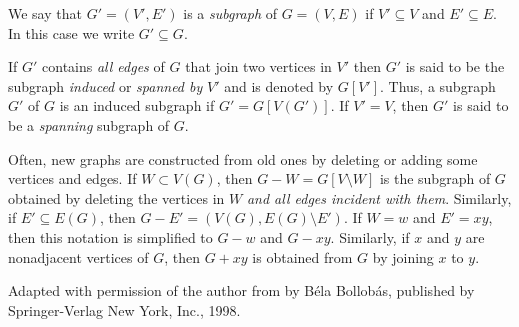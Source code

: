 \documentclass[12pt]{article}
\begin{document}
We say that $G' = (V',E')$ is a \emph{subgraph} of $G = (V,E)$ if $V' \subseteq V$ and $E' \subseteq E$. In this case we write $G' \subseteq G$.

If $G'$ contains \emph{all edges} of $G$ that join two vertices in $V'$ then $G'$ is said to be the subgraph \emph{induced} or \emph{spanned by} $V'$ and is denoted by $G[V']$. Thus, a subgraph $G'$ of $G$ is an induced subgraph if $G' = G[V(G')]$. If $V' = V$, then $G'$ is said to be a \emph{spanning} subgraph of $G$.

Often, new graphs are constructed from old ones by deleting or adding some vertices and edges. If $W \subset V(G)$, then $G - W = G[V\setminus W]$ is the subgraph of $G$ obtained by deleting the vertices in $W$ \emph{and all edges incident with them}. Similarly, if $E' \subseteq E(G)$, then $G - E' = (V(G),E(G) \setminus E')$. If $W = {w}$ and $E' = {xy}$, then this notation is simplified to $G - w$ and $G - xy$. Similarly, if $x$ and $y$ are nonadjacent vertices of $G$, then $G + xy$ is obtained from $G$ by joining $x$ to $y$.


\footnotesize{Adapted with permission of the author from \emph{} by B\'{e}la Bollob\'{a}s, published by Springer-Verlag New York, Inc., 1998.}
\end{document}
